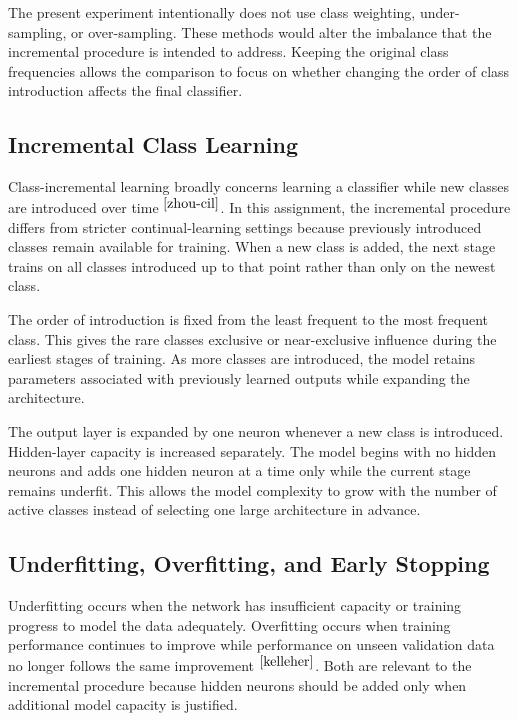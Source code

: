 \documentclass[conference]{IEEEtran}
\begin{document}
The present experiment intentionally does not use class weighting, under-sampling, or over-sampling. These methods would alter the imbalance that the incremental procedure is intended to address. Keeping the original class frequencies allows the comparison to focus on whether changing the order of class introduction affects the final classifier.

\subsection{Incremental Class Learning}

Class-incremental learning broadly concerns learning a classifier while new classes are introduced over time $^{\cite{zhou-cil}}$. In this assignment, the incremental procedure differs from stricter continual-learning settings because previously introduced classes remain available for training. When a new class is added, the next stage trains on all classes introduced up to that point rather than only on the newest class.

The order of introduction is fixed from the least frequent to the most frequent class. This gives the rare classes exclusive or near-exclusive influence during the earliest stages of training. As more classes are introduced, the model retains parameters associated with previously learned outputs while expanding the architecture.

The output layer is expanded by one neuron whenever a new class is introduced. Hidden-layer capacity is increased separately. The model begins with no hidden neurons and adds one hidden neuron at a time only while the current stage remains underfit. This allows the model complexity to grow with the number of active classes instead of selecting one large architecture in advance.

\subsection{Underfitting, Overfitting, and Early Stopping}

Underfitting occurs when the network has insufficient capacity or training progress to model the data adequately. Overfitting occurs when training performance continues to improve while performance on unseen validation data no longer follows the same improvement $^{\cite{kelleher}}$. Both are relevant to the incremental procedure because hidden neurons should be added only when additional model capacity is justified.
\end{document}
